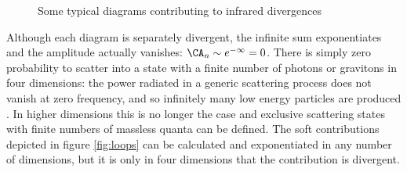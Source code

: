 \documentclass[11pt]{article}
\begin{document}
\begin{figure}[h!]
\caption{Some typical diagrams contributing to infrared divergences }\label{fig:loops}
\label{IRdiagrams}
\end{figure} 
Although each diagram is separately divergent, the infinite sum exponentiates and the amplitude actually vanishes: $\CA_n \sim e^{-\infty} = 0$. There is simply zero probability to scatter into a state with a finite number of photons or gravitons in four dimensions: the power radiated in a generic scattering process does not vanish at zero frequency, and so infinitely many low energy particles are produced \cite{mott_1931,Bloch:1937pw}. In higher dimensions this is no longer the case and exclusive scattering states with finite numbers of massless quanta can be defined. The soft contributions depicted in figure \ref{fig:loops} can be calculated and exponentiated in any number of dimensions, but it is only in four dimensions that the contribution is divergent. 
\end{document}
